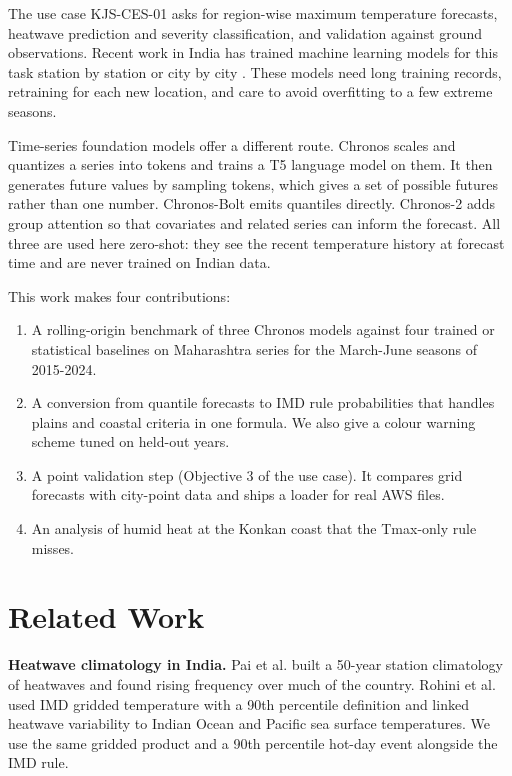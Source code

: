 \documentclass[conference,10pt]{IEEEtran}
\begin{document}
The use case KJS-CES-01 asks for region-wise maximum temperature forecasts, heatwave prediction and severity classification, and validation against ground observations. Recent work in India has trained machine learning models for this task station by station or city by city \cite{ratnam2023ml,khan2022hybrid,choudary2025compare}. These models need long training records, retraining for each new location, and care to avoid overfitting to a few extreme seasons.

Time-series foundation models offer a different route. Chronos \cite{ansari2024chronos} scales and quantizes a series into tokens and trains a T5 language model \cite{raffel2020t5} on them. It then generates future values by sampling tokens, which gives a set of possible futures rather than one number. Chronos-Bolt emits quantiles directly. Chronos-2 \cite{ansari2025chronos2} adds group attention so that covariates and related series can inform the forecast. All three are used here zero-shot: they see the recent temperature history at forecast time and are never trained on Indian data.

This work makes four contributions:
\begin{enumerate}
\item A rolling-origin benchmark of three Chronos models against four trained or statistical baselines on \NSeries{} Maharashtra series for the March-June seasons of 2015-2024.
\item A conversion from quantile forecasts to IMD rule probabilities that handles plains and coastal criteria in one formula. We also give a colour warning scheme tuned on held-out years.
\item A point validation step (Objective 3 of the use case). It compares grid forecasts with city-point data and ships a loader for real AWS files.
\item An analysis of humid heat at the Konkan coast that the Tmax-only rule misses.
\end{enumerate}

\section{Related Work}
\textbf{Heatwave climatology in India.} Pai et al. \cite{pai2013heat} built a 50-year station climatology of heatwaves and found rising frequency over much of the country. Rohini et al. \cite{rohini2016heat} used IMD gridded temperature \cite{srivastava2009grid} with a 90th percentile definition and linked heatwave variability to Indian Ocean and Pacific sea surface temperatures. We use the same gridded product and a 90th percentile hot-day event alongside the IMD rule.
\end{document}
